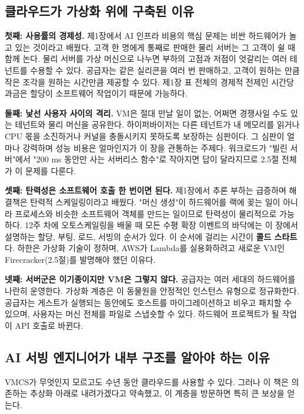 \subsection*{클라우드가 가상화 위에 구축된 이유}

\textbf{첫째: 사용률의 경제성.} 제1장에서 AI 인프라 비용의 핵심 문제는 비싼 하드웨어가 놀고 있는 것이라고 배웠다. 고객 한 명에게 통째로 판매한 물리 서버는 그 고객이 쉴 때 함께 논다. 물리 서버를 가상 머신으로 나누면 부하의 고점과 저점이 엇갈리는 여러 테넌트를 수용할 수 있다. 공급자는 같은 실리콘을 여러 번 판매하고, 고객이 원하는 만큼 작은 조각을 원하는 시간만큼 제공할 수 있다. 제1장 표 전체의 경제적 전제인 시간당 과금은 할당이 소프트웨어 작업이기 때문에 가능하다.

\textbf{둘째: 낯선 사용자 사이의 격리.} VM은 절대 만날 일이 없는, 어쩌면 경쟁사일 수도 있는 테넌트와 물리 머신을 공유한다. 하이퍼바이저는 다른 테넌트가 내 메모리를 읽거나 CPU 몫을 소진하거나 커널을 충돌시키지 못하도록 보장하는 심판이다. 그 심판이 얼마나 강력하며 성능 비용은 얼마인지가 이 장을 관통하는 주제다. 워크로드가 "빌린 서버"에서 "200 ms 동안만 사는 서버리스 함수"로 작아지면 답이 달라지므로 2.5절 전체가 이 문제를 다룬다.

\textbf{셋째: 탄력성은 소프트웨어 호출 한 번이면 된다.} 제1장에서 추론 부하는 급증하며 해결책은 탄력적 스케일링이라고 배웠다. "머신 생성"이 하드웨어를 랙에 꽂는 일이 아니라 프로세스와 비슷한 소프트웨어 객체를 만드는 일이므로 탄력성이 물리적으로 가능하다. 12주 차에 오토스케일링을 배울 때 모든 수평 확장 이벤트의 바닥에는 이 장에서 설명하는 할당, 부팅, 로드, 서빙의 순서가 있다. 이 순서에 걸리는 시간이 \textbf{콜드 스타트}다. 하한은 가상화 기술이 정하며, AWS가 Lambda를 실용화하려고 새로운 VM인 Firecracker(2.5절)를 발명해야 했던 이유다.

\textbf{넷째: 서버군은 이기종이지만 VM은 그렇지 않다.} 공급자는 여러 세대의 하드웨어를 나란히 운영한다. 가상화 계층은 이 동물원을 안정적인 인스턴스 유형으로 정규화한다. 공급자는 게스트가 실행되는 동안에도 호스트를 마이그레이션하고 비우고 패치할 수 있으며, 사용자는 머신 전체를 파일로 스냅숏할 수 있다. 하드웨어 프로젝트가 될 작업이 API 호출로 바뀐다.

\subsection*{AI 서빙 엔지니어가 내부 구조를 알아야 하는 이유}

VMCS가 무엇인지 모르고도 수년 동안 클라우드를 사용할 수 있다. 그러나 이 책은 의존하는 추상화 아래로 내려가겠다고 약속했고, 이 계층을 방문하면 특히 큰 보상을 얻는다.

